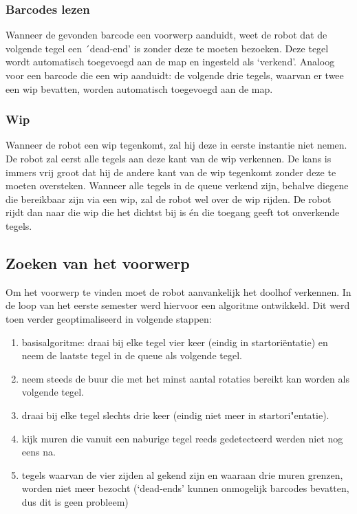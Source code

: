 \documentclass[tt3]{penoverslag}
\begin{document}
\subsubsection{Barcodes lezen}
\label{ssec:AlgoBar}

Wanneer de gevonden barcode een voorwerp aanduidt, weet de robot dat de volgende tegel een ´dead-end' is zonder deze te moeten bezoeken. Deze tegel wordt automatisch toegevoegd aan de map en ingesteld als `verkend'.
Analoog voor een barcode die een wip aanduidt: de volgende drie tegels, waarvan er twee een wip bevatten, worden automatisch toegevoegd aan de map.

\subsubsection{Wip}
\label{ssec:AlgoWip}
Wanneer de robot een wip tegenkomt, zal hij deze in eerste instantie niet nemen. De robot zal eerst alle tegels aan deze kant van de wip verkennen. De kans is immers vrij groot dat hij de andere kant van de wip tegenkomt zonder deze te moeten oversteken. Wanneer alle tegels in de queue verkend zijn, behalve diegene die bereikbaar zijn via een wip, zal de robot wel over de wip rijden. De robot rijdt dan naar die wip die het dichtst bij is \'en die toegang geeft tot onverkende tegels.


\subsection{Zoeken van het voorwerp} %
\label{ssec:AlgoZoek}
Om het voorwerp te vinden moet de robot aanvankelijk het doolhof verkennen. In de loop van het eerste semester werd hiervoor een algoritme ontwikkeld. Dit werd toen verder geoptimaliseerd in volgende stappen: 

\begin{enumerate}
\item basisalgoritme: draai bij elke tegel vier keer (eindig in startori\"entatie) en neem de laatste tegel in de queue als volgende tegel.
\item neem steeds de buur die met het minst aantal rotaties bereikt kan worden als volgende tegel.
\item draai bij elke tegel slechts drie keer (eindig niet meer in startori"entatie).
\item kijk muren die vanuit een naburige tegel reeds gedetecteerd werden  niet nog eens na.
\item tegels waarvan de vier zijden al gekend zijn en waaraan drie muren grenzen, worden niet meer bezocht (`dead-ends' kunnen onmogelijk barcodes bevatten, dus dit is geen probleem)
\end{enumerate}
\end{document}
